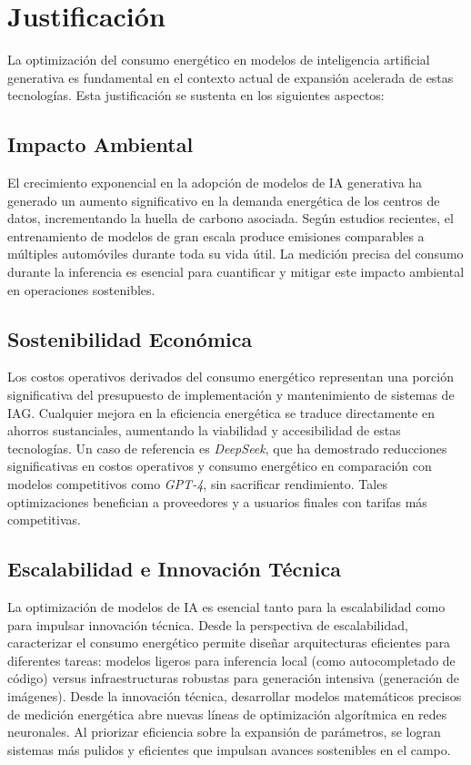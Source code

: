 \section{Justificación}

La optimización del consumo energético en modelos de inteligencia artificial generativa es fundamental en el contexto actual de expansión acelerada de estas tecnologías. Esta justificación se sustenta en los siguientes aspectos:

\subsection{Impacto Ambiental}

El crecimiento exponencial en la adopción de modelos de IA generativa ha generado un aumento significativo en la demanda energética de los centros de datos, incrementando la huella de carbono asociada. Según estudios recientes, el entrenamiento de modelos de gran escala produce emisiones comparables a múltiples automóviles durante toda su vida útil. La medición precisa del consumo durante la inferencia es esencial para cuantificar y mitigar este impacto ambiental en operaciones sostenibles.

\subsection{Sostenibilidad Económica}

Los costos operativos derivados del consumo energético representan una porción significativa del presupuesto de implementación y mantenimiento de sistemas de IAG. Cualquier mejora en la eficiencia energética se traduce directamente en ahorros sustanciales, aumentando la viabilidad y accesibilidad de estas tecnologías. Un caso de referencia es \textit{DeepSeek}, que ha demostrado reducciones significativas en costos operativos y consumo energético en comparación con modelos competitivos como \textit{GPT-4}, sin sacrificar rendimiento. Tales optimizaciones benefician a proveedores y a usuarios finales con tarifas más competitivas.

\subsection{Escalabilidad e Innovación Técnica}

La optimización de modelos de IA es esencial tanto para la escalabilidad como para impulsar innovación técnica. Desde la perspectiva de escalabilidad, caracterizar el consumo energético permite diseñar arquitecturas eficientes para diferentes tareas: modelos ligeros para inferencia local (como autocompletado de código) versus infraestructuras robustas para generación intensiva (generación de imágenes). Desde la innovación técnica, desarrollar modelos matemáticos precisos de medición energética abre nuevas líneas de optimización algorítmica en redes neuronales. Al priorizar eficiencia sobre la expansión de parámetros, se logran sistemas más pulidos y eficientes que impulsan avances sostenibles en el campo.

